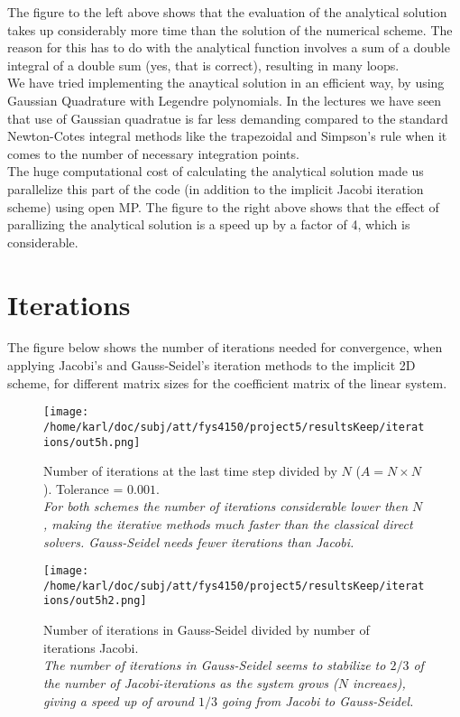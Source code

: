 \documentclass{article}
\begin{document}
The figure to the left above shows that the evaluation of the analytical solution takes up considerably more time than the solution of the numerical scheme. The reason for this has to do with the analytical function involves a sum of a double integral of a double sum (yes, that is correct), resulting in many loops.\\

We have tried implementing the anaytical solution in an efficient way, by using Gaussian Quadrature with Legendre polynomials. In the lectures we have seen that use of Gaussian quadratue is far less demanding compared to the standard Newton-Cotes integral methods like the trapezoidal and Simpson's rule when it comes to the number of necessary integration points. \\

The huge computational cost of calculating the analytical solution made us parallelize this part of the code (in addition to the implicit Jacobi iteration scheme) using open MP. The figure to the right above shows that the effect of parallizing the analytical solution is a speed up by a factor of 4, which is considerable.

\section{Iterations}
The figure below shows the number of iterations needed for convergence, when applying Jacobi's and Gauss-Seidel's iteration methods to the implicit 2D scheme, for different matrix sizes for the coefficient matrix of the linear system.

\begin{minipage}{.45\textwidth} 
	\begin{figure}[H]
		\centering
		\texttt{[image: /home/karl/doc/subj/att/fys4150/project5/resultsKeep/iterations/out5h.png]}
		\caption{Number of iterations at the last time step divided by $N$ ($A = N \times N$). Tolerance = $0.001$. \\ \textit{For both schemes the number of iterations considerable lower then $N$, making the iterative methods much faster than the classical direct solvers. Gauss-Seidel needs fewer iterations than Jacobi.}}
		\label{fig:iterations1}
	\end{figure}
\end{minipage}\hfill
\begin{minipage}{.45\textwidth} 
	\begin{figure}[H]
		\centering
		\texttt{[image: /home/karl/doc/subj/att/fys4150/project5/resultsKeep/iterations/out5h2.png]}
		\caption{Number of iterations in Gauss-Seidel divided by number of iterations Jacobi.\\ \textit{The number of iterations in Gauss-Seidel seems to stabilize to $2/3$ of the number of Jacobi-iterations as the system grows ($N$ increaes), giving a speed up of around $1/3$ going from Jacobi to Gauss-Seidel.}}
		\label{fig:iterations2}
	\end{figure}
\end{minipage}\hfill
\vspace{2ex}
\end{document}
